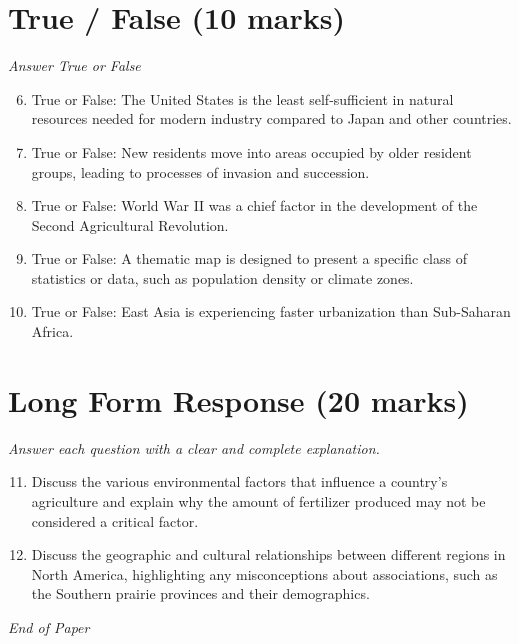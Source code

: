 \documentclass[12pt]{article}
\begin{document}
\section*{True / False (10 marks)}
\textit{Answer True or False}
\begin{enumerate}[label=\arabic*.]
\setcounter{enumi}{5}
\item True or False: The United States is the least self-sufficient in natural resources needed for modern industry compared to Japan and other countries.
\item True or False: New residents move into areas occupied by older resident groups, leading to processes of invasion and succession.
\item True or False: World War II was a chief factor in the development of the Second Agricultural Revolution.
\item True or False: A thematic map is designed to present a specific class of statistics or data, such as population density or climate zones.
\item True or False: East Asia is experiencing faster urbanization than Sub-Saharan Africa.
\end{enumerate}

\section*{Long Form Response (20 marks)}
\textit{Answer each question with a clear and complete explanation.}
\begin{enumerate}[label=\arabic*.]
\setcounter{enumi}{10}
\item Discuss the various environmental factors that influence a country's agriculture and explain why the amount of fertilizer produced may not be considered a critical factor.
\item Discuss the geographic and cultural relationships between different regions in North America, highlighting any misconceptions about associations, such as the Southern prairie provinces and their demographics.
\end{enumerate}

\vfill
\noindent\textit{End of Paper}
\end{document}
